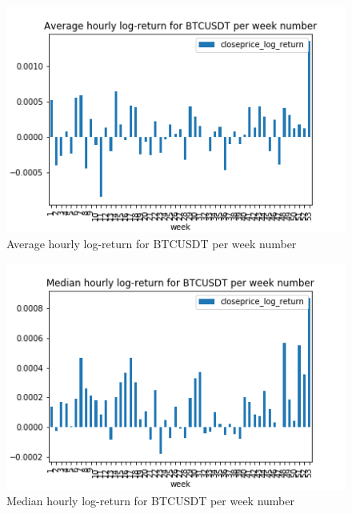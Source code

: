 \documentclass[twoside]{report}
\begin{document}
\begin{spacing}{1}
\begin{figure}[!htbp]
    \centering
    \includegraphics[scale = 0.5]{Images/Average hourly log-return for BTCUSDT per week number.png}
    \caption{Average hourly log-return for BTCUSDT per week number}
    \label{Average hourly log-return for BTCUSDT per week number}
\end{figure}

\begin{figure}[!htbp]
    \centering
    \includegraphics[scale = 0.5]{Images/Median hourly log-return for BTCUSDT per week number.png}
    \caption{Median hourly log-return for BTCUSDT per week number}
    \label{Median hourly log-return for BTCUSDT per week number}
\end{figure}


\end{spacing}
\end{document}

